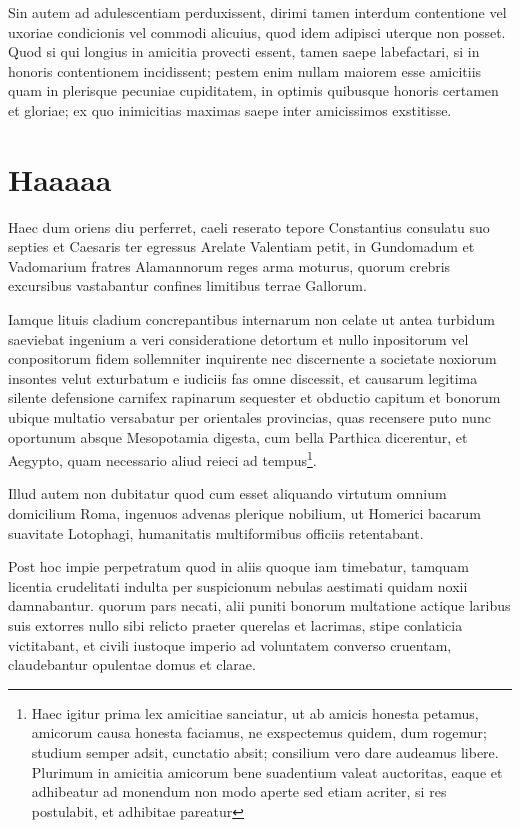 \documentclass[12pt]{book}
\begin{document}
Sin autem ad adulescentiam perduxissent, dirimi tamen interdum contentione vel uxoriae condicionis vel commodi alicuius, quod idem adipisci uterque non posset. Quod si qui longius in amicitia provecti essent, tamen saepe labefactari, si in honoris contentionem incidissent; pestem enim nullam maiorem esse amicitiis quam in plerisque pecuniae cupiditatem, in optimis quibusque honoris certamen et gloriae; ex quo inimicitias maximas saepe inter amicissimos exstitisse.

\section{Haaaaa}
Haec dum oriens diu perferret, caeli reserato tepore Constantius consulatu suo septies et Caesaris ter egressus Arelate Valentiam petit, in Gundomadum et Vadomarium fratres Alamannorum reges arma moturus, quorum crebris excursibus vastabantur confines limitibus terrae Gallorum.

Iamque lituis cladium concrepantibus internarum non celate ut antea turbidum saeviebat ingenium a veri consideratione detortum et nullo inpositorum vel conpositorum fidem sollemniter inquirente nec discernente a societate noxiorum insontes velut exturbatum e iudiciis fas omne discessit, et causarum legitima silente defensione carnifex rapinarum sequester et obductio capitum et bonorum ubique multatio versabatur per orientales provincias, quas recensere puto nunc oportunum absque Mesopotamia digesta, cum bella Parthica dicerentur, et Aegypto, quam necessario aliud reieci ad tempus\footnote{Haec igitur prima lex amicitiae sanciatur, ut ab amicis honesta petamus, amicorum causa honesta faciamus, ne exspectemus quidem, dum rogemur; studium semper adsit, cunctatio absit; consilium vero dare audeamus libere. Plurimum in amicitia amicorum bene suadentium valeat auctoritas, eaque et adhibeatur ad monendum non modo aperte sed etiam acriter, si res postulabit, et adhibitae pareatur}.

Illud autem non dubitatur quod cum esset aliquando virtutum omnium domicilium Roma, ingenuos advenas plerique nobilium, ut Homerici bacarum suavitate Lotophagi, humanitatis multiformibus officiis retentabant.

Post hoc impie perpetratum quod in aliis quoque iam timebatur, tamquam licentia crudelitati indulta per suspicionum nebulas aestimati quidam noxii damnabantur. quorum pars necati, alii puniti bonorum multatione actique laribus suis extorres nullo sibi relicto praeter querelas et lacrimas, stipe conlaticia victitabant, et civili iustoque imperio ad voluntatem converso cruentam, claudebantur opulentae domus et clarae.
\end{document}
